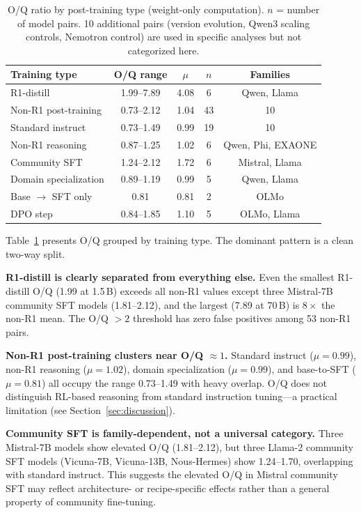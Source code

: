 \documentclass[11pt]{article}
\begin{document}
\begin{table}[t]
\centering
\caption{O/Q ratio by post-training type (weight-only computation).
$n$ = number of model pairs.
10 additional pairs (version evolution, Qwen3 scaling controls, Nemotron control)
are used in specific analyses but not categorized here.}
\label{tab:taxonomy}
\begin{tabular}{lcccc}
\toprule
Training type & O/Q range & $\mu$ & $n$ & Families \\
\midrule
R1-distill & 1.99--7.89 & 4.08 & 6 & Qwen, Llama \\
Non-R1 post-training & 0.73--2.12 & 1.04 & 43 & 10 \\
\quad Standard instruct & 0.73--1.49 & 0.99 & 19 & 10 \\
\quad Non-R1 reasoning & 0.87--1.25 & 1.02 & 6 & Qwen, Phi, EXAONE \\
\quad Community SFT & 1.24--2.12 & 1.72 & 6 & Mistral, Llama \\
\quad Domain specialization & 0.89--1.19 & 0.99 & 5 & Qwen, Llama \\
\quad Base $\to$ SFT only & 0.81 & 0.81 & 2 & OLMo \\
\quad DPO step & 0.84--1.85 & 1.10 & 5 & OLMo, Llama \\
\bottomrule
\end{tabular}
\end{table}

Table~\ref{tab:taxonomy} presents O/Q grouped by training type.
The dominant pattern is a clean two-way split.

\textbf{R1-distill is clearly separated from everything else.}
Even the smallest R1-distill O/Q (1.99 at 1.5\,B) exceeds all non-R1 values
except three Mistral-7B community SFT models (1.81--2.12), and the largest
(7.89 at 70\,B) is $8\times$ the non-R1 mean.
The O/Q $> 2$ threshold has zero false positives among 53 non-R1 pairs.

\textbf{Non-R1 post-training clusters near O/Q $\approx 1$.}
Standard instruct ($\mu = 0.99$), non-R1 reasoning ($\mu = 1.02$), domain
specialization ($\mu = 0.99$), and base-to-SFT ($\mu = 0.81$) all occupy the
range 0.73--1.49 with heavy overlap.
O/Q does not distinguish RL-based reasoning from standard instruction tuning---a
practical limitation (see Section~\ref{sec:discussion}).

\textbf{Community SFT is family-dependent, not a universal category.}
Three Mistral-7B models show elevated O/Q (1.81--2.12), but three Llama-2
community SFT models (Vicuna-7B, Vicuna-13B, Nous-Hermes) show 1.24--1.70,
overlapping with standard instruct.
This suggests the elevated O/Q in Mistral community SFT may reflect
architecture- or recipe-specific effects rather than a general property of
community fine-tuning.
\end{document}
